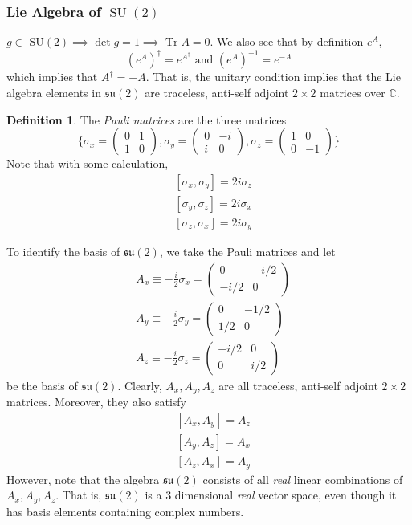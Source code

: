 \documentclass{article}
\DeclareMathOperator{\Tr}{Tr}
\DeclareMathOperator{\SU}{SU}
\theoremstyle{remark}
\theoremstyle{definition}
\newtheorem{definition}{Definition}[section]
\begin{document}
\subsubsection[Lie Algebra of SU(2)]{Lie Algebra of \(\SU(2)\)}
$g \in $ SU$(2) \implies \det{g} = 1 \implies \Tr{A} = 0$. We also see that by definition $e^A$, 
\[(e^A)^\dagger = e^{A^\dagger} \text{ and } (e^A)^{-1} = e^{-A}\]
which implies that $A^\dagger = - A$. That is, the unitary condition implies that the Lie algebra elements in $\mathfrak{su}(2)$ are traceless, anti-self adjoint $2 \times 2$ matrices over $\mathbb{C}$. 

\begin{definition}
The \textit{Pauli matrices} are the three matrices
\[\bigg\{ \sigma_x = \begin{pmatrix}
0&1\\1&0
\end{pmatrix}, \sigma_y = \begin{pmatrix}
0&-i\\i&0
\end{pmatrix}, \sigma_z = \begin{pmatrix}
1&0\\0&-1
\end{pmatrix}\bigg\}\]
Note that with some calculation, 
\begin{align*}
    & [\sigma_x, \sigma_y] = 2 i \sigma_z \\
    & [\sigma_y, \sigma_z] = 2 i \sigma_x \\
    & [\sigma_z, \sigma_x] = 2 i \sigma_y
\end{align*}
\end{definition}
To identify the basis of $\mathfrak{su}(2)$, we take the Pauli matrices and let 
\begin{align*}
    & A_x \equiv - \frac{i}{2} \sigma_x = \begin{pmatrix} 0&-i/2\\-i/2&0 \end{pmatrix} \\
    & A_y \equiv - \frac{i}{2} \sigma_y = \begin{pmatrix}0&-1/2\\1/2&0\end{pmatrix} \\
    & A_z \equiv -\frac{i}{2} \sigma_z = \begin{pmatrix}-i/2&0\\0&i/2\end{pmatrix}
\end{align*} 
be the basis of $\mathfrak{su}(2)$. Clearly, $A_x, A_y, A_z$ are all traceless, anti-self adjoint $2 \times 2$ matrices. Moreover, they also satisfy
\begin{align*}
    & [A_x, A_y] = A_z \\
    & [A_y, A_z] = A_x \\
    & [A_z, A_x] = A_y
\end{align*}
However, note that the algebra $\mathfrak{su}(2)$ consists of all \textit{real} linear combinations of $A_x, A_y, A_z$. That is, $\mathfrak{su}(2)$ is a 3 dimensional \textit{real} vector space, even though it has basis elements containing complex numbers. 
\end{document}
